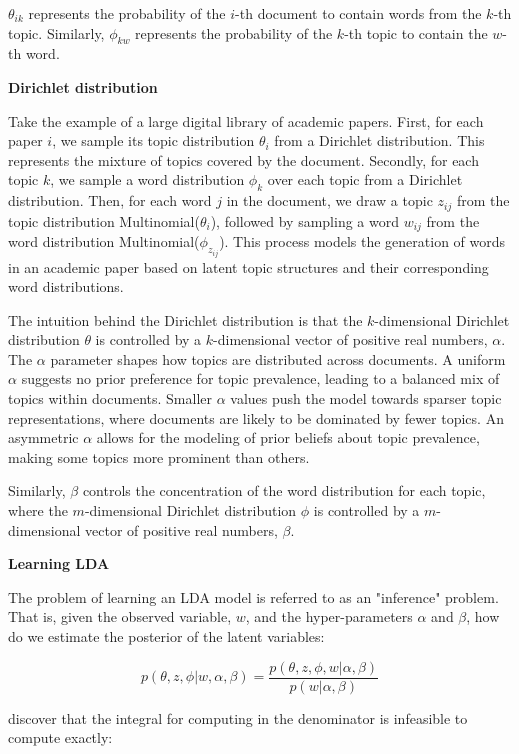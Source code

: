 \documentclass{article}
\begin{document}
$\theta_{ik}$ represents the probability of the $i$-th document to contain words from the $k$-th topic. Similarly, $\phi_{kw}$ represents the probability of the $k$-th topic to contain the $w$-th word.

\textbf{Dirichlet distribution}

Take the example of a large digital library of academic papers. First, for each paper $i$, we sample its topic distribution $\theta_i$ from a Dirichlet distribution. This represents the mixture of topics covered by the document. Secondly, for each topic $k$, we sample a word distribution $\phi_k$ over each topic from a Dirichlet distribution. Then, for each word $j$ in the document, we draw a topic $z_{ij}$ from the topic distribution Multinomial($\theta_i$), followed by sampling a word $w_{ij}$ from the word distribution Multinomial($\phi_{z_{ij}}$). This process models the generation of words in an academic paper based on latent topic structures and their corresponding word distributions.

The intuition behind the Dirichlet distribution is that the $k$-dimensional Dirichlet distribution $\theta$ is controlled by a $k$-dimensional vector of positive real numbers, $\alpha$. The $\alpha$ parameter shapes how topics are distributed across documents. A uniform $\alpha$ suggests no prior preference for topic prevalence, leading to a balanced mix of topics within documents. Smaller $\alpha$ values push the model towards sparser topic representations, where documents are likely to be dominated by fewer topics. An asymmetric $\alpha$ allows for the modeling of prior beliefs about topic prevalence, making some topics more prominent than others.

Similarly, $\beta$ controls the concentration of the word distribution for each topic, where the $m$-dimensional Dirichlet distribution $\phi$ is controlled by a $m$-dimensional vector of positive real numbers, $\beta$.

\textbf{Learning LDA}

The problem of learning an LDA model is referred to as an "inference" problem. That is, given the observed variable, \( w \), and the hyper-parameters \( \alpha \) and \( \beta \), how do we estimate the posterior of the latent variables:

\[ p(\theta, z, \phi | w, \alpha, \beta) = \frac{p(\theta, z, \phi, w | \alpha, \beta)}{p(w | \alpha, \beta)} \]

\citet{blei_latent_2001} discover that the integral for computing in the denominator is infeasible to compute exactly:
\end{document}
